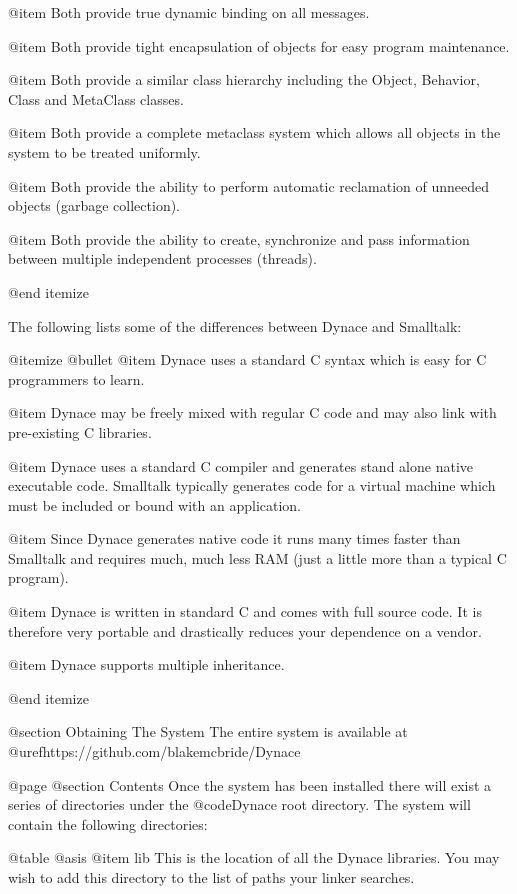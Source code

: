 @item
Both provide true dynamic binding on all messages.

@item
Both provide tight encapsulation of objects for
easy program maintenance.

@item
Both provide a similar class hierarchy including
the Object, Behavior, Class and MetaClass classes.

@item
Both provide a complete metaclass system which allows
all objects in the system to be treated uniformly.

@item
Both provide the ability to perform automatic reclamation
of unneeded objects (garbage collection).

@item
Both provide the ability to create, synchronize and
pass information between multiple independent processes (threads).

@end itemize


The following lists some of the differences between Dynace and
Smalltalk:

@itemize @bullet
@item
Dynace uses a standard C syntax which is easy for C programmers to learn.

@item
Dynace may be freely mixed with regular C code and may also link with
pre-existing C libraries.

@item
Dynace uses a standard C compiler and generates stand alone native
executable code.  Smalltalk typically generates code for a virtual
machine which must be included or bound with an application.

@item
Since Dynace generates native code it runs many times faster than Smalltalk
and requires much, much less RAM (just a little more than a typical C
program).

@item
Dynace is written in standard C and comes with full source code.  It is
therefore very portable and drastically reduces your dependence on a
vendor.

@item
Dynace supports multiple inheritance.

@end itemize

@section Obtaining The System
The entire system is available at @uref{https://github.com/blakemcbride/Dynace}





@page
@section Contents
Once the system has been installed there will exist a series of
directories under the @code{Dynace} root directory.  The system will contain
the following directories:


@table @asis
@item lib
This is the location of all the Dynace libraries.  You may wish to add
this directory to the list of paths your linker searches.

